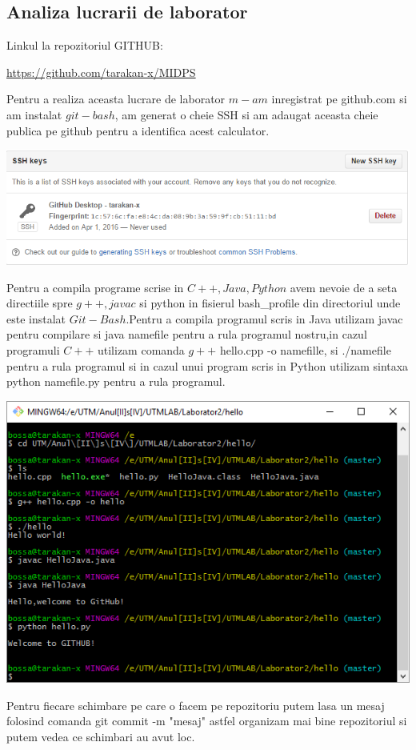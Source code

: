 \subsection{Analiza lucrarii de laborator}
Linkul la repozitoriul GITHUB:
\begin{center}
\url{https://github.com/tarakan-x/MIDPS}
\end{center}
Pentru a realiza aceasta lucrare de laborator $m-am$ inregistrat pe github.com si am instalat $git-bash$, am generat o cheie SSH si am adaugat aceasta cheie publica pe github pentru a identifica acest calculator.\\
\begin{center}
\includegraphics[scale=0.7]{images/ssh.PNG} 
\end{center}
Pentru a compila programe scrise in $C++,Java,Python$ avem nevoie de a seta directiile spre $g++,javac$ si python in fisierul bash\_profile din directoriul unde este instalat $Git-Bash$.Pentru a compila programul scris in Java utilizam javac pentru compilare si java namefile pentru a rula programul nostru,in cazul programuli $C++$ utilizam comanda $g++ $ hello.cpp -o namefille, si ./namefile pentru a rula programul si in cazul unui program scris in Python utilizam sintaxa python namefile.py pentru a rula programul.
\begin{center}
\includegraphics[scale=0.7]{images/java.png} 
\end{center}
Pentru fiecare schimbare pe care o facem pe repozitoriu putem lasa un mesaj folosind comanda git commit -m "mesaj" astfel organizam mai bine repozitoriul si putem vedea  ce schimbari au avut loc.

